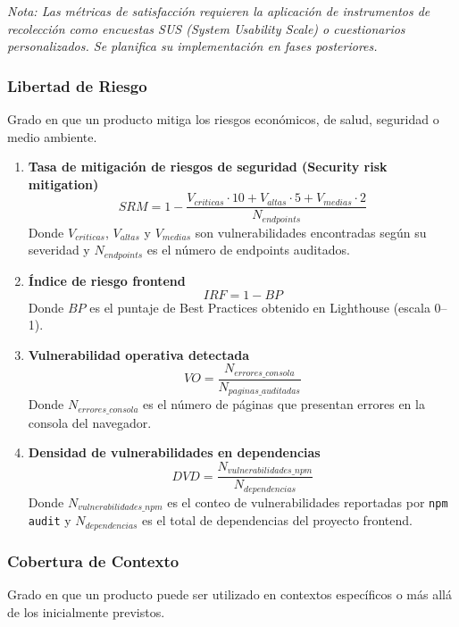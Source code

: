 \textit{Nota: Las métricas de satisfacción requieren la aplicación de instrumentos de recolección como encuestas SUS (System Usability Scale) o cuestionarios personalizados. Se planifica su implementación en fases posteriores.}

\subsubsection{Libertad de Riesgo}

Grado en que un producto mitiga los riesgos económicos, de salud, seguridad o medio ambiente.

\begin{enumerate}
    \item \textbf{Tasa de mitigación de riesgos de seguridad (Security risk mitigation)}
          \[
              SRM = 1 - \frac{V_{criticas} \cdot 10 + V_{altas} \cdot 5 + V_{medias} \cdot 2}{N_{endpoints}}
          \]
          Donde \(V_{criticas}\), \(V_{altas}\) y \(V_{medias}\) son vulnerabilidades encontradas según su severidad y \(N_{endpoints}\) es el número de endpoints auditados.

    \item \textbf{Índice de riesgo frontend}
          \[
              IRF = 1 - BP
          \]
          Donde \(BP\) es el puntaje de Best Practices obtenido en Lighthouse (escala 0--1).

    \item \textbf{Vulnerabilidad operativa detectada}
          \[
              VO = \frac{N_{errores\_consola}}{N_{paginas\_auditadas}}
          \]
          Donde \(N_{errores\_consola}\) es el número de páginas que presentan errores en la consola del navegador.

    \item \textbf{Densidad de vulnerabilidades en dependencias}
          \[
              DVD = \frac{N_{vulnerabilidades\_npm}}{N_{dependencias}}
          \]
          Donde \(N_{vulnerabilidades\_npm}\) es el conteo de vulnerabilidades reportadas por \texttt{npm audit} y \(N_{dependencias}\) es el total de dependencias del proyecto frontend.
\end{enumerate}

\subsubsection{Cobertura de Contexto}

Grado en que un producto puede ser utilizado en contextos específicos o más allá de los inicialmente previstos.

